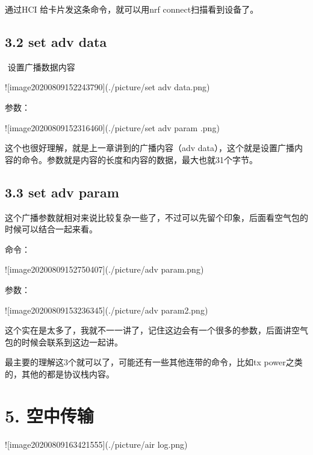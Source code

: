 \documentclass[letterpaper,10pt,english]{sphinxmanual}
\begin{document}

\begin{sphinxVerbatim}[commandchars=\\\{\}]
    
\end{sphinxVerbatim}

通过HCI 给卡片发这条命令，就可以用nrf connect扫描看到设备了。


\subsection{3.2 set adv data}
\label{\detokenize{test/ble_adv_scan_all:set-adv-data}}
​       设置广播数据内容

!{[}image\sphinxhyphen{}20200809152243790{]}(./picture/set adv data.png)

参数：

!{[}image\sphinxhyphen{}20200809152316460{]}(./picture/set adv param .png)

这个也很好理解，就是上一章讲到的广播内容（adv data），这个就是设置广播内容的命令。参数就是内容的长度和内容的数据，最大也就31个字节。


\subsection{3.3 set adv param}
\label{\detokenize{test/ble_adv_scan_all:set-adv-param}}
这个广播参数就相对来说比较复杂一些了，不过可以先留个印象，后面看空气包的时候可以结合一起来看。

命令：

!{[}image\sphinxhyphen{}20200809152750407{]}(./picture/adv param.png)

参数：


!{[}image\sphinxhyphen{}20200809153236345{]}(./picture/adv param2.png)

这个实在是太多了，我就不一一讲了，记住这边会有一个很多的参数，后面讲空气包的时候会联系到这边一起讲。

最主要的理解这3个就可以了，可能还有一些其他连带的命令，比如tx power之类的，其他的都是协议栈内容。


\section{5. 空中传输}
\label{\detokenize{test/ble_adv_scan_all:id4}}
!{[}image\sphinxhyphen{}20200809163421555{]}(./picture/air log.png)
\end{document}
